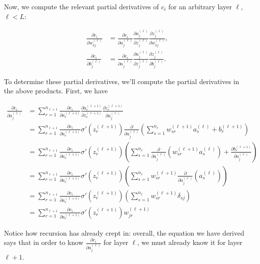 \documentclass{article}
\begin{document}
	Now, we compute the relevant partial derivatives of $c_i$ for an arbitrary layer $\ell$, $\ell < L$:
	
	\begin{align*}
		\frac{\partial c_i}{\partial w^{(\ell)}_{kj}} &= \frac{\partial c_i}{\partial a^{(\ell)}_j} \frac{\partial a^{(\ell)}_j}{\partial z^{(\ell)}_j} \frac{\partial z^{(\ell)}_j}{\partial w^{(\ell)}_{kj}}, \\
		\frac{\partial c_i}{\partial b^{(\ell)}_j} &= \frac{\partial c_i}{\partial a^{(\ell)}_j} \frac{\partial a^{(\ell)}_j}{\partial z^{(\ell)}_j} \frac{\partial z^{(\ell)}_j}{\partial b^{(\ell)}_j}.
	\end{align*}
	
	To determine these partial derivatives, we'll compute the partial derivatives in the above products. First, we have
	
	\begin{align*}
		\frac{\partial c_i}{\partial a^{(\ell)}_j} &= \sum_{r = 1}^{n_{\ell+1}} \frac{\partial c_i}{\partial a^{(\ell+1)}_r} \frac{\partial a^{(\ell+1)}_r}{\partial z^{(\ell + 1)}_r} \frac{\partial z^{(\ell + 1)}_r}{\partial a^{(\ell)}_j} \\
		&= \sum_{r = 1}^{n_{\ell+1}} \frac{\partial c_i}{\partial a^{(\ell+1)}_r} \sigma'(z^{(\ell + 1)}_r) \frac{\partial}{\partial a^{(\ell)}_j}\left(\sum_{s = 1}^{n_\ell} w^{(\ell + 1)}_{sr} a^{(\ell)}_s + b^{(\ell + 1)}_r\right) \\
		&= \sum_{r = 1}^{n_{\ell+1}} \frac{\partial c_i}{\partial a^{(\ell+1)}_r} \sigma'(z^{(\ell + 1)}_r) \left(\sum_{s = 1}^{n_\ell} \frac{\partial}{\partial a^{(\ell)}_j}\left(w^{(\ell + 1)}_{sr} a^{(\ell)}_s\right) + \frac{\partial b^{(\ell + 1)}_r}{\partial a^{(\ell)}_j}\right) \\
		&= \sum_{r = 1}^{n_{\ell+1}} \frac{\partial c_i}{\partial a^{(\ell+1)}_r} \sigma'(z^{(\ell + 1)}_r) \left(\sum_{s = 1}^{n_\ell} w^{(\ell + 1)}_{sr} \frac{\partial}{\partial a^{(\ell)}_j} \left( a^{(\ell)}_s \right) \right) \\
		&= \sum_{r = 1}^{n_{\ell+1}} \frac{\partial c_i}{\partial a^{(\ell+1)}_r} \sigma'(z^{(\ell + 1)}_r) \left(\sum_{s = 1}^{n_\ell} w^{(\ell + 1)}_{sr} \delta_{sj} \right) \\
		&= \sum_{r = 1}^{n_{\ell+1}} \frac{\partial c_i}{\partial a^{(\ell+1)}_r} \sigma'(z^{(\ell + 1)}_r) w^{(\ell + 1)}_{jr}
	\end{align*}
	
	Notice how recursion has already crept in: overall, the equation we have derived says that in order to know $\frac{\partial c_i}{\partial a^{(\ell)}_j}$ for layer $\ell$, we must already know it for layer $\ell + 1$.
	
\end{document}
